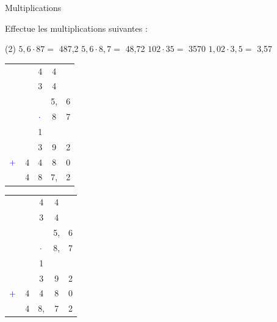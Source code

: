 \documentclass[a4paper,11pt]{report}
\begin{document}
\begin{resolu}{Multiplications}
{Effectue les multiplications suivantes :
\begin{tasks}(2)
\task $5,6 \cdot 87 =$ {{{\color{blue}487,2}}}
\task $5,6 \cdot 8,7 =$ {{{\color{blue}48,72}}}
\task $102 \cdot 35 =$ {{{\color{blue}3570}}}
\task $1,02 \cdot 3,5 =$ {{{\color{blue}3,57}}}
\end{tasks}

\bigskip

\begin{minipage}{0,45\linewidth}
{{{\color{blue}
\begin{tabular}{ccccc}
 & & {\color{red}\footnotesize{4}} &{\color{red}\footnotesize{4}} & \\
 & & {\color{red}\footnotesize{3}} & {\color{red}\footnotesize{4}} & \\
 & & & 5, & 6 \\
  & &${\color{blue}\cdot}$ & 8 & 7 \\\hline
   & & {\color{red}\footnotesize{1}} & & \\
  & & 3 & 9 & 2 \\ 
${\color{blue}+}$ & 4 & 4 & 8 & 0\\\hline
& 4 & 8 & 7, &2 \\
\end{tabular}
}}}
\end{minipage}\hfill
\begin{minipage}{0,45\linewidth}
{{{\color{blue}
\begin{tabular}{ccccc}
 & & {\color{red}\footnotesize{4}} &{\color{red}\footnotesize{4}} & \\
 & & {\color{red}\footnotesize{3}} & {\color{red}\footnotesize{4}} & \\
 & & & 5, & 6 \\
  & & ${\color{blue}\cdot}$& 8, & 7 \\\hline
   & & {\color{red}\footnotesize{1}} & & \\
  & & 3 & 9 & 2 \\ 
${\color{blue}+}$ & 4 & 4 & 8 & 0\\\hline
& 4 & 8, & 7 &2 \\
\end{tabular}
}}}
\end{minipage}

\bigskip

}
\end{resolu}
\end{document}
